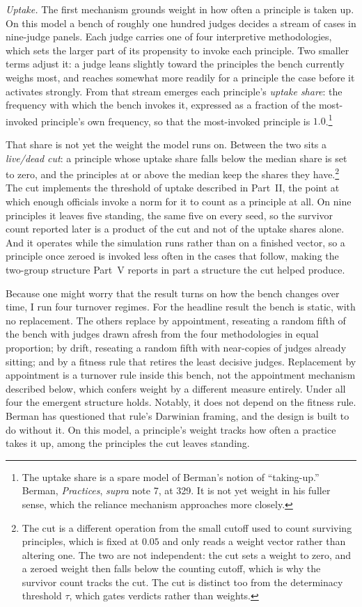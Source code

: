 \textit{Uptake.} The first mechanism grounds weight in how often a principle
is taken up. On this model a bench of roughly one hundred judges decides a stream of
cases in nine-judge panels. Each judge carries one of four interpretive methodologies, which sets the
larger part of its propensity to invoke each principle. Two smaller terms
adjust it: a judge leans slightly toward the principles the bench currently
weighs most, and reaches somewhat more readily for a principle the case before
it activates strongly. From that stream emerges each principle's \textit{uptake share}: the
frequency
with which the bench invokes it, expressed as a fraction of the most-invoked principle's own frequency, so that the most-invoked principle is
$1.0$.\footnote{The
uptake share is a spare model of Berman's notion of
``taking-up.'' Berman, \textit{Practices}, \textit{supra} note 7, at 329. It
is not yet weight in his fuller sense, which the reliance mechanism
approaches more closely.}

That share is not yet the weight the model runs on. Between the two sits a
\textit{live/dead cut}: a principle whose uptake share falls below the median
share is set to zero, and the principles at or above the median keep the
shares they have.\footnote{The cut is a different operation from the small cutoff used to
count surviving principles, which is fixed at $0.05$ and only reads a weight
vector rather than altering one. The two are not independent: the cut sets a
weight to zero, and a zeroed weight then falls below the counting cutoff,
which is why the survivor count tracks the cut. The cut is distinct too from the determinacy
threshold $\tau$, which gates verdicts rather than weights.} The cut
implements the threshold of uptake described in Part~II, the point at which
enough officials invoke a norm for it to count as a principle at all. On nine
principles it leaves five standing, the same five on every seed, so the
survivor count reported later is a product of the cut and not of the uptake
shares alone. And it operates while the simulation runs rather than on a
finished vector, so a principle once zeroed is invoked less often in the cases
that follow, making the two-group structure Part~V reports in part a
structure the cut helped produce.

Because one might worry that the result turns on
how the bench changes over time, I run four turnover regimes. For the headline result the bench is static, with no replacement. The others replace by appointment, reseating a random fifth of the bench
with judges drawn afresh from the four methodologies in equal proportion; by
drift, reseating a random fifth with near-copies of judges already
sitting; and by a fitness rule that retires the least decisive judges.
Replacement by appointment is a turnover rule inside this bench, not the
appointment mechanism described below, which confers weight by a different
measure entirely. Under all four the emergent structure holds. Notably, it does not depend on the fitness rule.
Berman has questioned that rule's Darwinian framing, and the design is built
to do without it. On this model, a principle's weight tracks how often a practice
takes it up, among the principles the cut leaves standing.

